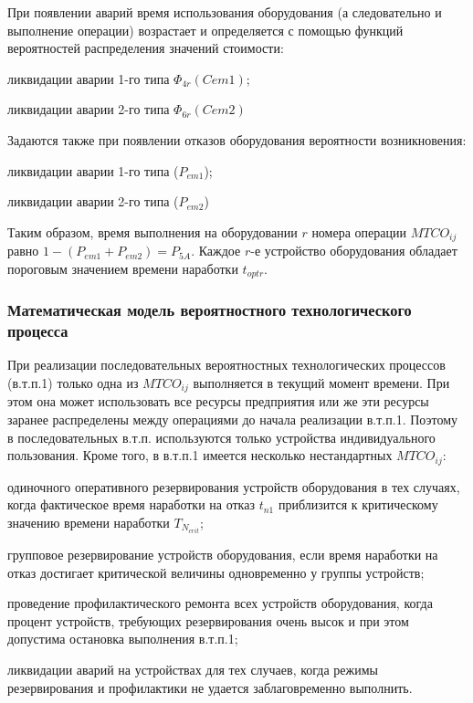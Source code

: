 При появлении аварий время  использования оборудования (а следовательно и выполнение операции) возрастает и определяется с помощью функций вероятностей распределения значений стоимости:
\begin{textitemize}
    \item ликвидации аварии 1-го типа $\Phi_{4r}(C{em1})$;
    \item ликвидации аварии 2-го типа $\Phi_{6r}(C{em2})$
\end{textitemize}

Задаются также при появлении отказов оборудования  вероятности возникновения:
\begin{textitemize}
    \item ликвидации аварии 1-го типа ($P_{em1}$);
    \item ликвидации аварии 2-го типа ($P_{em2}$)
\end{textitemize}

Таким образом, время выполнения на оборудовании $r$ номера операции $MTCO_{ij}$ равно $1-(P_{em1}+P_{em2}) = P_{5A}$.  Каждое $r$-е устройство оборудования обладает пороговым значением времени наработки $t_{optr}$.



\subsubsection{Математическая модель вероятностного технологического процесса}
\label{sec_chapter_enterprise_tp_model}


При реализации последовательных вероятностных технологических процессов (в.т.п.1) только одна из $MTCO_{ij}$ выполняется в текущий момент времени. При этом она может использовать все ресурсы предприятия или же эти ресурсы заранее распределены между операциями до начала реализации в.т.п.1. Поэтому в последовательных в.т.п. используются только устройства индивидуального пользования. Кроме того, в в.т.п.1 имеется несколько нестандартных $MTCO_{ij}$:
\begin{textitemize}
    \item одиночного оперативного резервирования устройств оборудования в тех случаях, когда фактическое время наработки на отказ $t_{n1}$ приблизится к критическому значению времени наработки $T_{N_{crit}}$;
    \item групповое резервирование устройств оборудования, если время наработки на отказ достигает критической величины одновременно у группы устройств;
    \item проведение профилактического ремонта всех устройств оборудования, когда процент устройств, требующих резервирования очень высок и при этом допустима остановка выполнения в.т.п.1;
    \item ликвидации аварий на устройствах для тех случаев, когда режимы резервирования и профилактики не удается заблаговременно выполнить.
\end{textitemize}



